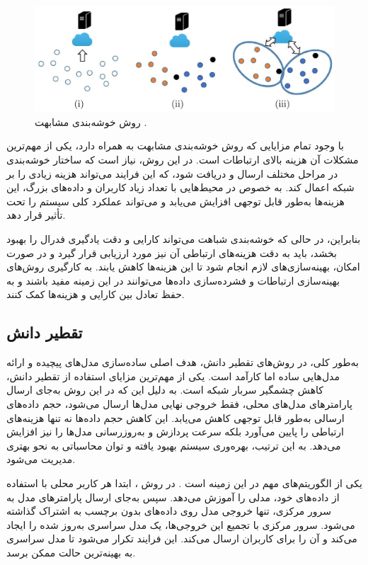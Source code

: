 \begin{figure}[b]
	\centering
	\includegraphics[scale=0.9]{images/chap3/similarity_clustering.png}%
	\caption{%
		روش خوشه‌بندی مشابهت 
		\cite{ghosh2019robust}%
		.
	}
	\label{similarity_clustering}
	\centering
\end{figure}




با وجود تمام مزایایی که روش خوشه‌بندی مشابهت به همراه دارد، یکی از مهم‌ترین مشکلات آن هزینه بالای ارتباطات است. در این روش، نیاز است که ساختار خوشه‌بندی در مراحل مختلف ارسال و دریافت شود، که این فرایند می‌تواند هزینه زیادی را بر شبکه اعمال کند. به خصوص در محیط‌هایی با تعداد زیاد کاربران و داده‌های بزرگ، این هزینه‌ها به‌طور قابل توجهی افزایش می‌یابد و می‌تواند عملکرد کلی سیستم را تحت تأثیر قرار دهد.

بنابراین، در حالی که خوشه‌بندی شباهت می‌تواند کارایی و دقت یادگیری فدرال را بهبود بخشد، باید به دقت هزینه‌های ارتباطی آن نیز مورد ارزیابی قرار گیرد و در صورت امکان، بهینه‌سازی‌های لازم انجام شود تا این هزینه‌ها کاهش یابند. به کارگیری روش‌های بهینه‌سازی ارتباطات و فشرده‌سازی داده‌ها می‌توانند در این زمینه مفید باشند و به حفظ تعادل بین کارایی و هزینه‌ها کمک کنند.


\subsection{
تقطیر دانش%
}
به‌طور کلی، در روش‌های تقطیر دانش، هدف اصلی ساده‌سازی مدل‌های پیچیده و ارائه مدل‌هایی ساده اما کارآمد است.
یکی از مهم‌ترین مزایای استفاده از تقطیر دانش، کاهش چشمگیر سربار شبکه است. به دلیل این که در این روش به‌جای ارسال پارامترهای مدل‌های محلی، فقط خروجی نهایی مدل‌ها ارسال می‌شود، حجم داده‌های ارسالی به‌طور قابل توجهی کاهش می‌یابد. این کاهش حجم داده‌ها نه تنها هزینه‌های ارتباطی را پایین می‌آورد بلکه سرعت پردازش و به‌روزرسانی مدل‌ها را نیز افزایش می‌دهد. به این ترتیب، بهره‌وری سیستم بهبود یافته و توان محاسباتی به نحو بهتری مدیریت می‌شود.

یکی از الگوریتم‌های مهم در این زمینه
%
است
\cite{itahara2021distillation}.
در روش
%
، ابتدا هر کاربر محلی با استفاده از داده‌های خود، مدلی را آموزش می‌دهد. سپس به‌جای ارسال پارامترهای مدل به سرور مرکزی، تنها خروجی مدل روی داده‌های بدون برچسب به اشتراک گذاشته می‌شود. سرور مرکزی با تجمیع این خروجی‌ها، یک مدل سراسری به‌روز شده را ایجاد می‌کند و آن را برای کاربران ارسال می‌کند. این فرایند تکرار می‌شود تا مدل سراسری به بهینه‌ترین حالت ممکن برسد.

